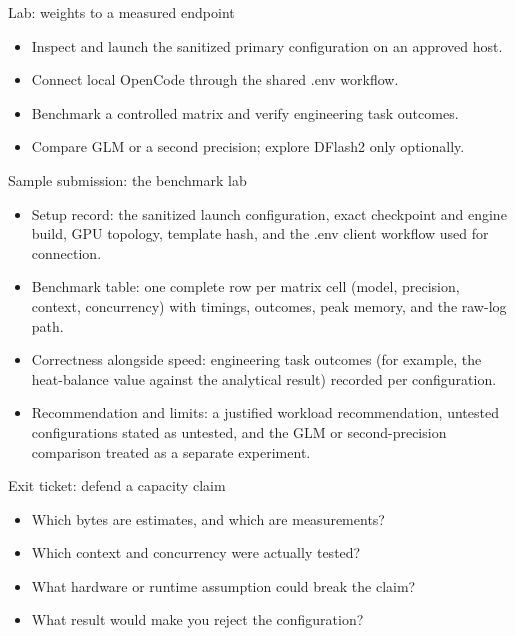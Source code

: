 \documentclass[aspectratio=169,11pt]{beamer}
\begin{document}
\begin{frame}[t,fragile]{Lab: weights to a measured endpoint}
\fontsize{11.5}{14}\selectfont
\begin{itemize}\setlength{\itemsep}{2mm}
\item Inspect and launch the sanitized primary configuration on an approved host.
\item Connect local OpenCode through the shared .env workflow.
\item Benchmark a controlled matrix and verify engineering task outcomes.
\item Compare GLM or a second precision; explore DFlash2 only optionally.
\end{itemize}
\end{frame}
\begin{frame}[t,fragile]{Sample submission: the benchmark lab}
\fontsize{11.5}{14}\selectfont
\begin{itemize}\setlength{\itemsep}{2mm}
\item Setup record: the sanitized launch configuration, exact checkpoint and engine build, GPU topology, template hash, and the .env client workflow used for connection.
\item Benchmark table: one complete row per matrix cell (model, precision, context, concurrency) with timings, outcomes, peak memory, and the raw-log path.
\item Correctness alongside speed: engineering task outcomes (for example, the heat-balance value against the analytical result) recorded per configuration.
\item Recommendation and limits: a justified workload recommendation, untested configurations stated as untested, and the GLM or second-precision comparison treated as a separate experiment.
\end{itemize}
\end{frame}
\begin{frame}[t,fragile]{Exit ticket: defend a capacity claim}
\fontsize{11.5}{14}\selectfont
\begin{itemize}\setlength{\itemsep}{2mm}
\item Which bytes are estimates, and which are measurements?
\item Which context and concurrency were actually tested?
\item What hardware or runtime assumption could break the claim?
\item What result would make you reject the configuration?
\end{itemize}
\end{frame}
\end{document}
